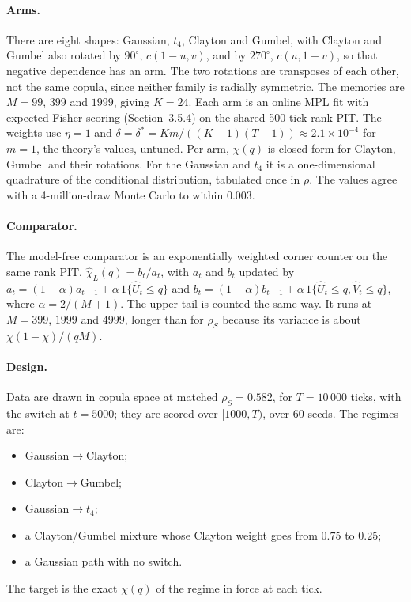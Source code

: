 \paragraph{Arms.} There are eight shapes: Gaussian, $t_4$, Clayton and Gumbel, with Clayton and Gumbel
also rotated by $90^\circ$, $c(1-u,v)$, and by $270^\circ$, $c(u,1-v)$, so that negative dependence
has an arm. The two rotations are transposes of each other, not the same copula, since neither
family is radially symmetric. The memories are $M=99$, $399$ and $1999$, giving $K=24$. Each arm is
an online MPL fit with expected Fisher scoring (Section~3.5.4) on the shared 500-tick rank PIT. The
weights use $\eta=1$ and $\delta=\delta^*=Km/((K-1)(T-1))\approx2.1\times10^{-4}$ for $m=1$, the
theory's values, untuned. Per arm, $\chi(q)$ is closed form for Clayton, Gumbel and their rotations.
For the Gaussian and $t_4$ it is a one-dimensional quadrature of the conditional distribution,
tabulated once in $\rho$. The values agree with a 4-million-draw Monte Carlo to within $0.003$.

\paragraph{Comparator.} The model-free comparator is an exponentially weighted corner counter on the
same rank PIT, $\hat\chi_L(q)=b_t/a_t$, with $a_t$ and $b_t$ updated by
$a_t=(1-\alpha)a_{t-1}+\alpha\,1\{\hat U_t\le q\}$ and
$b_t=(1-\alpha)b_{t-1}+\alpha\,1\{\hat U_t\le q,\hat V_t\le q\}$, where $\alpha=2/(M+1)$. The upper
tail is counted the same way. It runs at $M=399$, $1999$ and $4999$, longer than for $\rho_S$ because
its variance is about $\chi(1-\chi)/(qM)$.

\paragraph{Design.} Data are drawn in copula space at matched $\rho_S=0.582$, for $T=10\,000$ ticks,
with the switch at $t=5000$; they are scored over $[1000,T)$, over 60 seeds. The regimes are:
\begin{itemize}
  \item Gaussian$\to$Clayton;
  \item Clayton$\to$Gumbel;
  \item Gaussian$\to t_4$;
  \item a Clayton/Gumbel mixture whose Clayton weight goes from $0.75$ to $0.25$;
  \item a Gaussian path with no switch.
\end{itemize}
The target is the exact $\chi(q)$ of the regime in force at each tick.

